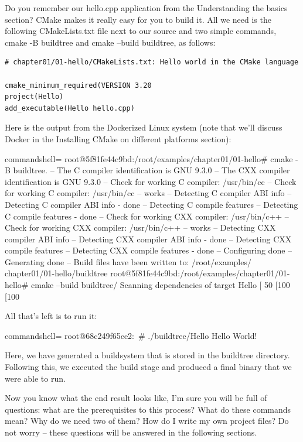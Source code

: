 Do you remember our hello.cpp application from the Understanding the basics section? CMake makes it really easy for you to build it. All we need is the following CMakeLists.txt file next to our source and two simple commands, cmake -B buildtree and cmake --build buildtree, as follows:

\begin{lstlisting}[style=styleCMake]
# chapter01/01-hello/CMakeLists.txt: Hello world in the CMake language
	
cmake_minimum_required(VERSION 3.20
project(Hello)
add_executable(Hello hello.cpp)
\end{lstlisting}

Here is the output from the Dockerized Linux system (note that we'll discuss Docker in the Installing CMake on different platforms section):

\begin{tcblisting}{commandshell={}}
root@5f81fe44c9bd:/root/examples/chapter01/01-hello# cmake
-B buildtree.
-- The C compiler identification is GNU 9.3.0
-- The CXX compiler identification is GNU 9.3.0
-- Check for working C compiler: /usr/bin/cc
-- Check for working C compiler: /usr/bin/cc -- works
-- Detecting C compiler ABI info
-- Detecting C compiler ABI info - done
-- Detecting C compile features
-- Detecting C compile features - done
-- Check for working CXX compiler: /usr/bin/c++
-- Check for working CXX compiler: /usr/bin/c++ -- works
-- Detecting CXX compiler ABI info
-- Detecting CXX compiler ABI info - done
-- Detecting CXX compile features
-- Detecting CXX compile features - done
-- Configuring done
-- Generating done
-- Build files have been written to: /root/examples/
chapter01/01-hello/buildtree
root@5f81fe44c9bd:/root/examples/chapter01/01-hello# cmake
--build buildtree/
Scanning dependencies of target Hello
[ 50%
[100%
[100%
\end{tcblisting}

All that's left is to run it:

\begin{tcblisting}{commandshell={}}
root@68c249f65ce2:~# ./buildtree/Hello
Hello World!
\end{tcblisting}

Here, we have generated a buildsystem that is stored in the buildtree directory. Following this, we executed the build stage and produced a final binary that we were able to run.

Now you know what the end result looks like, I'm sure you will be full of questions: what are the prerequisites to this process? What do these commands mean? Why do we need two of them? How do I write my own project files? Do not worry – these questions will be answered in the following sections.

